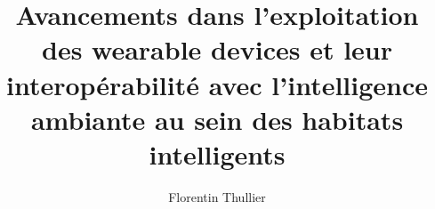 \documentclass[12pt,times,sujthese,french]{uqac}
\begin{document}
\title{Avancements dans l'exploitation des wearable devices et leur interopérabilité avec l'intelligence ambiante au sein des habitats intelligents}
\author{Florentin Thullier}

\maketitle
		
\opening


\tableofcontents
\listoftables
\listoffigures
\listofacro
%

%

\maincontent





%






%
\end{document}
